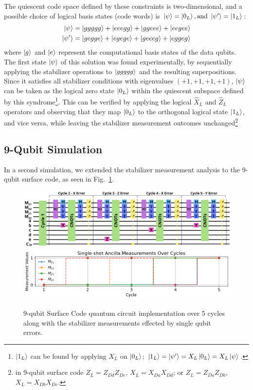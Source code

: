 \documentclass[9pt,a4paper,twocolumn,twoside]{tau-class/tau}
\begin{document}
The quiescent code space defined by these constraints is two-dimensional, and a possible choice of logical basis states (code words) is \(\ket{\psi} = \ket{0_L} ,\text{and } \ket{\psi'}=\ket{1_L}\):
\begin{align}
    \ket{\psi} &= \ket{ggggg}+\ket{eeegg}+\ket{ggeee}+\ket{eegee}\\
    \ket{\psi'} &= \ket{gegge}+\ket{egege}+\ket{geeeg}+\ket{eggeg}
    \label{eq: logical zero and one}
\end{align}
where $\ket{g}$ and $\ket{e}$ represent the computational basis states of the data qubits.
The first state $\ket{\psi}$ of this solution was found experimentally, by sequentially applying the stabilizer operations to $\ket{ggggg}$ and the resulting superpositions. Since it satisfies all stabilizer conditions with eigenvalues $(+1, +1, +1, +1)$, $\ket{\psi}$ can be taken as the logical zero state $\ket{0_L}$ within the quiescent subspace defined by this syndrome\footnote{$\ket{1_L}$ can be found by applying $X_L$ on $\ket{0_L}$; $\ket{1_L} = \ket{\psi'} = X_L\ket{0_L}= X_L\ket{\psi}$.}. This can be verified by applying the logical $\hat{X}_L$ and $\hat{Z}_L$ operators and observing that they map $\ket{0_L}$ to the orthogonal logical state $\ket{1_L}$, and vice versa, while leaving the stabilizer measurement outcomes unchanged\footnote{in 9-qubit surface code $Z_L = Z_{Dd}Z_{De}$, $X_L = X_{Da}X_{Dd}$; or $Z_L = Z_{Da}Z_{Db}$, $X_L = X_{Db}X_{De}$.}

\subsection{9-Qubit Simulation}
In a second simulation, we extended the stabilizer measurement analysis to the 9-qubit surface code, as seen in Fig.~\ref{fig:9qubit_eigenvlaues}.

\begin{figure}[h!]
    \centering
    \includegraphics[width=1\linewidth]{figures/Circuit9qubitsErrors.png}
    \includegraphics[width=1\linewidth]{figures/EigenvaulePlot9qubitsErrors.png}
    \caption{9-qubit Surface Code quantum circuit implementation over 5 cycles along with the stabilizer measurements effected by single qubit errors.}
    \label{fig:9qubit_eigenvlaues}
\end{figure}
\end{document}
